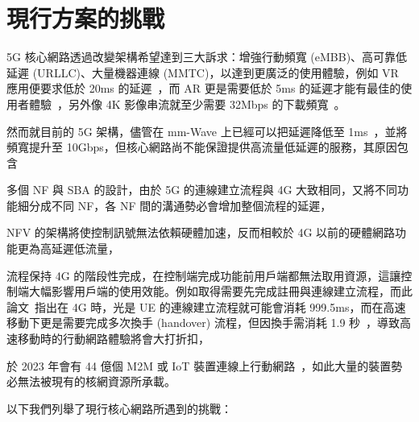 \section{現行方案的挑戰}
\label{sec:challenge}


5G 核心網路透過改變架構希望達到三大訴求：增強行動頻寬 (eMBB)、高可靠低延遲 (URLLC)、大量機器連線 (MMTC)，以達到更廣泛的使用體驗，例如 VR 應用便要求低於 20ms 的延遲~\cite{URLLVR}，而 AR 更是需要低於 5ms 的延遲才能有最佳的使用者體驗~\cite{cloud_arvr_wp}，另外像 4K 影像串流就至少需要 32Mbps 的下載頻寬~\cite{4k_req}。

然而就目前的 5G 架構，儘管在 mm-Wave 上已經可以把延遲降低至 1ms~\cite{LLmmWave}，並將頻寬提升至 10Gbps，但核心網路尚不能保證提供高流量低延遲的服務，其原因包含
\begin{enumerate*}
\item 多個 NF 與 SBA 的設計，由於 5G 的連線建立流程與 4G 大致相同，又將不同功能細分成不同 NF，各 NF 間的溝通勢必會增加整個流程的延遲，
\item NFV 的架構將使控制訊號無法依賴硬體加速，反而相較於 4G 以前的硬體網路功能更為高延遲低流量，
\item 流程保持 4G 的階段性完成，在控制端完成功能前用戶端都無法取用資源，這讓控制端大幅影響用戶端的使用效能。例如取得需要先完成註冊與連線建立流程，而此論文~\cite{paper.DPCM}指出在 4G 時，光是 UE 的連線建立流程就可能會消耗 999.5ms，而在高速移動下更是需要完成多次換手 (handover) 流程，但因換手需消耗 1.9 秒~\cite{paper.DPCM}，導致高速移動時的行動網路體驗將會大打折扣，
\item 於 2023 年會有 44 億個 M2M 或 IoT 裝置連線上行動網路~\cite{cisco_internet_report_2023}，如此大量的裝置勢必無法被現有的核網資源所承載。
\end{enumerate*}

以下我們列舉了現行核心網路所遇到的挑戰：


